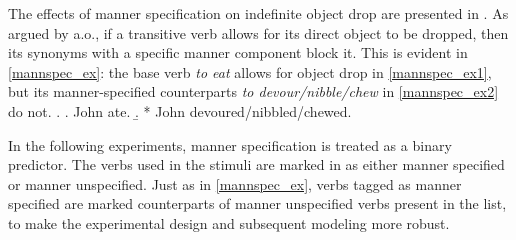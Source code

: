 The effects of manner specification on indefinite object drop are presented in . As argued by \textcite{Ruda2017} a.o., if a transitive verb allows for its direct object to be dropped, then its synonyms with a specific manner component block it. This is evident in \ref{mannspec_ex}: the base verb \textit{to eat} allows for object drop in \ref{mannspec_ex1}, but its manner-specified counterparts \textit{to devour/nibble/chew} in \ref{mannspec_ex2} do not.
\ex.\label{mannspec_ex} \a. John ate. \label{mannspec_ex1} 
\b. * John devoured/nibbled/chewed. \label{mannspec_ex2}

In the following experiments, manner specification is treated as a binary predictor. The verbs used in the stimuli are marked in  as either manner specified or manner unspecified. Just as in \ref{mannspec_ex}, verbs tagged as manner specified are marked counterparts of manner unspecified verbs present in the list, to make the experimental design and subsequent modeling more robust.
